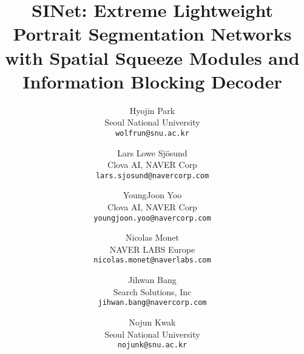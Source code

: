 \documentclass[10pt,twocolumn,letterpaper]{article}
\begin{document}
\title{SINet: Extreme Lightweight Portrait Segmentation Networks with Spatial Squeeze Modules and Information Blocking Decoder }

\author{
Hyojin Park \\
Seoul National University\\
{\tt\small wolfrun@snu.ac.kr}
\and
Lars Lowe Sj{\"o}sund \\
 Clova AI, NAVER Corp \\
{\tt\small lars.sjosund@navercorp.com}
\and
YoungJoon Yoo \\
 Clova AI, NAVER Corp \\
{\tt\small youngjoon.yoo@navercorp.com}
\and
Nicolas Monet \\
NAVER LABS Europe\\
{\tt\small nicolas.monet@naverlabs.com}
\and
Jihwan Bang \\
 Search Solutions, Inc \\
{\tt\small jihwan.bang@navercorp.com}
\and
Nojun Kwak  \\
Seoul National University\\
{\tt\small nojunk@snu.ac.kr}
}
\maketitle
\ifwacvfinal\thispagestyle{empty}\fi
\end{document}

